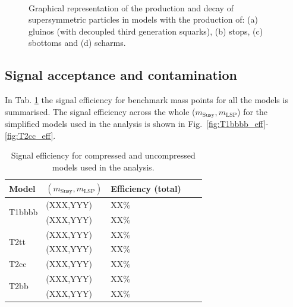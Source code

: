 \begin{figure}[h!]
\begin{center}
{            \label{fig:T2cc_feyn}
            } ~~
        \caption{Graphical representation of the production and decay of
            supersymmetric particles in models with the production of: (a)
            gluinos (with decoupled third generation squarks), (b) stops, (c)
            sbottoms and (d) scharms.}
        \label{fig:simplified-models-feyn}
    \end{center}
\end{figure}

\subsection{Signal acceptance and contamination}
\label{sec:sig-accept-contam}
In Tab. \ref{tab:sig-eff} the signal efficiency for benchmark mass points for
all the models is summarised. The signal efficiency across the whole
($m_{\mathrm{Susy}},m_{\mathrm{LSP}}$) for the simplified models used in the
analysis is shown in Fig.~\ref{fig:T1bbbb_eff}-\ref{fig:T2cc_eff}.

\begin{table}[h!]
    \caption{Signal efficiency for compressed and uncompressed models used in
        the analysis.}
    \label{tab:sig-eff}
    \centering
    \begin{tabular}{ lllll }
        \hline \hline
        Model & $(m_{\mathrm{Susy}},m_{\mathrm{LSP}})$ & Efficiency (total) \\ 
        \hline
        \multirow{2}{*}{T1bbbb}
            & (XXX,YYY) & XX\% \\
            & (XXX,YYY) & XX\% \\
        \hline
        \multirow{2}{*}{T2tt}
            & (XXX,YYY) & XX\% \\
            & (XXX,YYY) & XX\% \\
        \hline
        T2cc
            & (XXX,YYY) & XX\% \\
        \hline
        \multirow{2}{*}{T2bb}
            & (XXX,YYY) & XX\% \\
            & (XXX,YYY) & XX\% \\
        \hline \hline
    \end{tabular}
\end{table}

